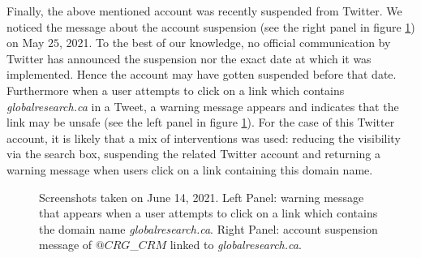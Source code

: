 \documentclass{article}
\begin{document}
Finally, the above mentioned account was recently suspended from Twitter. We noticed the message about the account suspension (see the right panel in figure \ref{fig4bis}) on May $25$, 2021. To the best of our knowledge, no official communication by Twitter has announced the suspension nor the exact date at which it was implemented. Hence the account may have gotten suspended before that date. Furthermore when a user attempts to click on a link which contains {\it globalresearch.ca} in a Tweet, a warning message appears and indicates that the link may be unsafe (see the left panel in figure \ref{fig4bis}). For the case of this Twitter account, it is likely that a mix of interventions was used: reducing the visibility via the search box, suspending the related Twitter account and returning a warning message when users click on a link containing this domain name.  


\begin{figure}[h]
	\begin{center}
	\end{center}
	\caption{Screenshots taken on June 14, 2021. Left Panel: warning message that appears when a user attempts to click on a link which contains the domain name {\it globalresearch.ca}. Right Panel: account suspension message of $@CRG$\_$CRM$ linked to {\it globalresearch.ca}.  }
	\label{fig4bis}
\end{figure}

\end{document}
